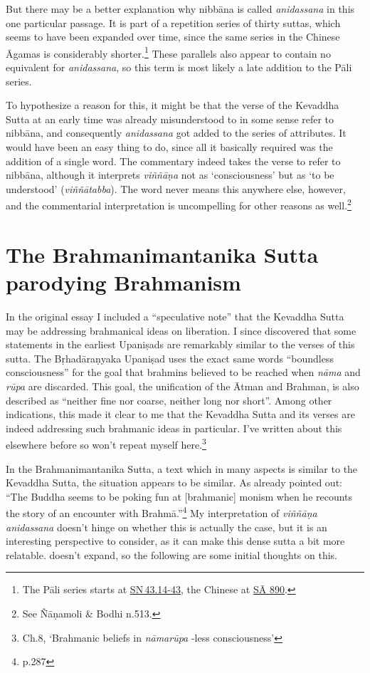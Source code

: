 \documentclass[10pt, openany]{book}
\begin{document}
But there may be a better explanation why nibbāna is called \textit{anidassana} in this one particular passage. It is part of a repetition series of thirty suttas, which seems to have been expanded over time, since the same series in the Chinese Āgamas is considerably shorter.\footnote {The Pāli series starts at \href{https://suttacentral.net/sn43.14-43/en/sujato}{SN 43.14-43}, the Chinese at \href{https://suttacentral.net/Sa890}{SĀ 890}.} These parallels also appear to contain no equivalent for \textit{anidassana}, so this term is most likely a late addition to the Pāli series.


To hypothesize a reason for this, it might be that the verse of the Kevaddha Sutta at an early time was already misunderstood to in some sense refer to nibbāna, and consequently \textit{anidassana} got added to the series of attributes. It would have been an easy thing to do, since all it basically required was the addition of a single word. The commentary indeed takes the verse to refer to nibbāna, although it interprets \textit{viññāṇa} not as ‘consciousness’ but as ‘to be understood’ (\textit{viññātabba}). The word never means this anywhere else, however, and the commentarial interpretation is uncompelling for other reasons as well.\footnote {See Ñāṇamoli \& Bodhi n.513.}




\section{The Brahmanimantanika Sutta parodying Brahmanism}
In the original essay I included a “speculative note” that the Kevaddha Sutta may be addressing brahmanical ideas on liberation. I since discovered that some statements in the earliest Upaniṣads are remarkably similar to the verses of this sutta. The Bṛhadāraṇyaka Upaniṣad uses the exact same words “boundless consciousness” for the goal that brahmins believed to be reached when \textit{nāma} and \textit{rūpa} are discarded. This goal, the unification of the Ātman and Brahman, is also described as “neither fine nor coarse, neither long nor short”. Among other indications, this made it clear to me that the Kevaddha Sutta and its verses are indeed addressing such brahmanic ideas in particular. I’ve written about this elsewhere before so won’t repeat myself here.\footnote {\cite{Sunyo 2024} Ch.8, ‘Brahmanic beliefs in \textit{nāmarūpa} -less consciousness’}


In the Brahmanimantanika Sutta, a text which in many aspects is similar to the Kevaddha Sutta, the situation appears to be similar. As \cite{Reat} already pointed out: “The Buddha seems to be poking fun at [brahmanic] monism when he recounts the story of an encounter with Brahmā.”\footnote {\cite{Reat} p.287} My interpretation of \textit{viññāṇa anidassana} doesn’t hinge on whether this is actually the case, but it is an interesting perspective to consider, as it can make this dense sutta a bit more relatable. \cite{Reat} doesn’t expand, so the following are some initial thoughts on this.
\end{document}

